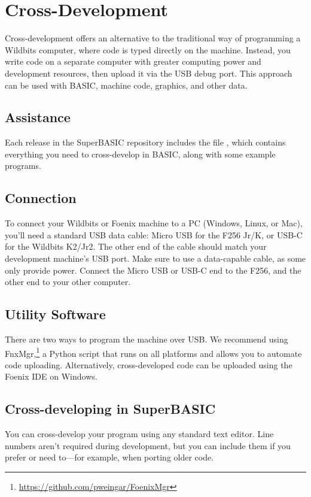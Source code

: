 \chapter{Cross-Development}
\label{chap:crossdev}

Cross-development offers an alternative to the traditional way of programming a Wildbits computer, where code is typed directly on the machine. Instead, you write code on a separate computer with greater computing power and development resources, then upload it via the USB debug port. This approach can be used with BASIC, machine code, graphics, and other data.

\section{Assistance}

Each release in the SuperBASIC repository includes the file , which contains everything you need to cross-develop in BASIC, along with some example programs.

\section{Connection}

To connect your Wildbits or Foenix machine to a PC (Windows, Linux, or Mac), you'll need a standard USB data cable: Micro USB for the F256 Jr/K, or USB-C for the Wildbits K2/Jr2. The other end of the cable should match your development machine's USB port. Make sure to use a data-capable cable, as some only provide power. Connect the Micro USB or USB-C end to the F256, and the other end to your other computer.

\section{Utility Software}

There are two ways to program the machine over USB. We recommend using FnxMgr,\footnote{\url{https://github.com/pweingar/FoenixMgr}} a Python script that runs on all platforms and allows you to automate code uploading. Alternatively, cross-developed code can be uploaded using the Foenix IDE on Windows.

\section{Cross-developing in SuperBASIC}

You can cross-develop your program using any standard text editor. Line numbers aren’t required during development, but you can include them if you prefer or need to---for example, when porting older code.

